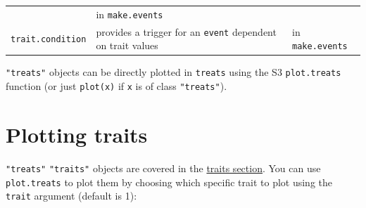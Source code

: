 \documentclass[
]{book}
\begin{document}
\begin{longtable}[]{@{}lll@{}}
\begin{minipage}[t]{0.28\columnwidth}
\end{minipage} & \begin{minipage}[t]{0.43\columnwidth}\raggedright
in \texttt{make.events}\strut
\end{minipage}\tabularnewline
\begin{minipage}[t]{0.20\columnwidth}\raggedright
\texttt{trait.condition}\strut
\end{minipage} & \begin{minipage}[t]{0.28\columnwidth}\raggedright
provides a trigger for an \texttt{event} dependent on trait values\strut
\end{minipage} & \begin{minipage}[t]{0.43\columnwidth}\raggedright
in \texttt{make.events}\strut
\end{minipage}\tabularnewline
\bottomrule
\end{longtable}

\texttt{"treats"} objects can be directly plotted in \texttt{treats} using the S3 \texttt{plot.treats} function (or just \texttt{plot(x)} if \texttt{x} is of class \texttt{"treats"}).

\hypertarget{plotting-traits}{%
\chapter{Plotting traits}\label{plotting-traits}}

\texttt{"treats"} \texttt{"traits"} objects are covered in the \protect\hyperlink{maketraits}{traits section}.
You can use \texttt{plot.treats} to plot them by choosing which specific trait to plot using the \texttt{trait} argument (default is 1):
\end{document}
